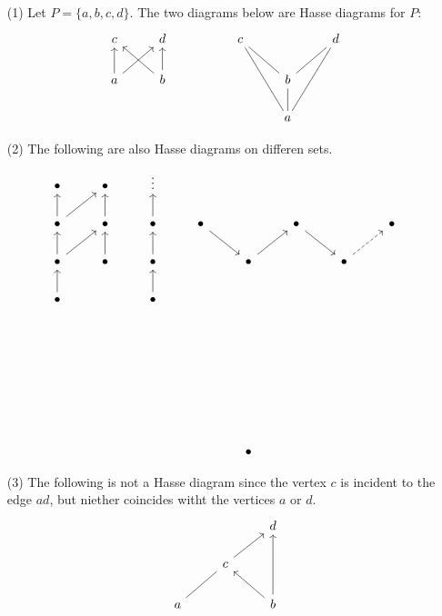 \begin{example}\label{example_1.7}
  \begin{enumerate}
    \item[(1)] Let $P=\{a,b,c,d\}$. The two diagrams below are Hasse
      diagrams for $P$:
      \[\begin{tikzcd}
        c & d && c && d \\
        a & b &&& b \\
          &&&& a
          \arrow[from=2-1, to=1-1]
          \arrow[from=2-1, to=1-2]
          \arrow[from=2-2, to=1-1]
          \arrow[from=2-2, to=1-2]
          \arrow[no head, from=2-5, to=1-4]
          \arrow[no head, from=2-5, to=1-6]
          \arrow[no head, from=3-5, to=1-4]
          \arrow[no head, from=3-5, to=1-6]
          \arrow[no head, from=3-5, to=2-5]
      \end{tikzcd}\]

    \item[(2)] The following are also Hasse diagrams on differen sets.
      \[\begin{tikzcd}
        \bullet & \bullet & \vdots \\
        \bullet & \bullet & \bullet & \bullet && \bullet && \bullet \\
        \bullet & \bullet & \bullet && \bullet && \bullet \\
        \bullet && \bullet \\
        \\
        \\
        \\
        \\
        \\
                &&&& \bullet
                \arrow[from=2-1, to=1-1]
                \arrow[from=2-1, to=1-2]
                \arrow[from=2-2, to=1-2]
                \arrow[from=2-3, to=1-3]
                \arrow[from=2-4, to=3-5]
                \arrow[from=2-6, to=3-7]
                \arrow[from=3-1, to=2-1]
                \arrow[from=3-1, to=2-2]
                \arrow[from=3-2, to=2-2]
                \arrow[from=3-3, to=2-3]
                \arrow[from=3-5, to=2-6]
                \arrow[dashed, from=3-7, to=2-8]
                \arrow[from=4-1, to=3-1]
                \arrow[from=4-3, to=3-3]
      \end{tikzcd}\]

    \item[(3)] The following is not a Hasse diagram since the vertex
      $c$ is incident to the edge $ad$, but niether coincides witht
      the vertices $a$ or $d$.
      \[\begin{tikzcd}
          && d \\
          & c \\
        a && b
        \arrow[from=2-2, to=1-3]
        \arrow[no head, from=3-1, to=2-2]
        \arrow[from=3-3, to=1-3]
        \arrow[from=3-3, to=2-2]
      \end{tikzcd}\]


\end{enumerate}
\end{example}
